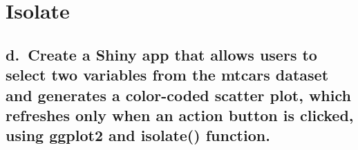 \documentclass[
]{book}
\begin{document}
\hypertarget{isolate}{%
\section{Isolate}\label{isolate}}

\hypertarget{d.-create-a-shiny-app-that-allows-users-to-select-two-variables-from-the-mtcars-dataset-and-generates-a-color-coded-scatter-plot-which-refreshes-only-when-an-action-button-is-clicked-using-ggplot2-and-isolate-function.}{%
\subsection{d.~Create a Shiny app that allows users to select two variables from the mtcars dataset and generates a color-coded scatter plot, which refreshes only when an action button is clicked, using ggplot2 and isolate() function.}\label{d.-create-a-shiny-app-that-allows-users-to-select-two-variables-from-the-mtcars-dataset-and-generates-a-color-coded-scatter-plot-which-refreshes-only-when-an-action-button-is-clicked-using-ggplot2-and-isolate-function.}}
\end{document}
